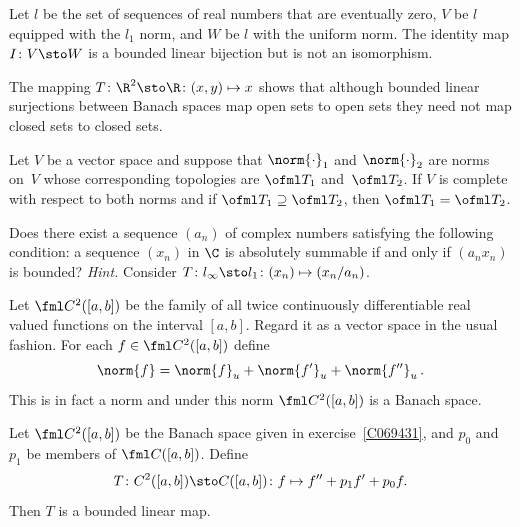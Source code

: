 \begin{exam} Let $l$ be the set of sequences of real numbers that are eventually zero,
$V$ be $l$ equipped with the $l_1$ norm, and $W$ be $l$ with the uniform norm.  The
identity map $I\colon V \sto W$ is a bounded linear bijection but is not an isomorphism.
\end{exam}

\begin{exam} The mapping $T\colon \R^2 \sto \R\colon (x,y) \mapsto x$ shows that although
bounded linear surjections between Banach spaces map open sets to open sets they need not
map closed sets to closed sets.
\end{exam}

\begin{prop} Let $V$ be a vector space and suppose that $\norm{\cdot}_1$ and
$\norm{\cdot}_2$ are norms on~$V$ whose corresponding topologies are $\ofml T_1$
and~$\ofml T_2$.  If $V$ is complete with respect to both norms and if $\ofml T_1
\supseteq \ofml T_2$, then $\ofml T_1 = \ofml T_2$.
\end{prop}

\begin{exer} Does there exist a sequence $(a_n)$ of complex numbers satisfying the
following condition: a sequence $(x_n)$ in $\C$ is absolutely summable if and only if
$(a_nx_n)$ is bounded? \emph{Hint.} Consider $ T\colon l_\infty \sto l_1\colon (x_n)
\mapsto (x_n/a_n)$.
\end{exer}

\begin{exam}\label{C069431} Let $\fml C^2([a,b])$ be the family of all twice continuously
differentiable real valued functions on the interval $[a,b]$. Regard it as a vector space
in the usual fashion. For each $f \in \fml C^2([a,b])$ define
    \[ \norm{f} = \norm{f}_u + \norm{f'}_u + \norm{f''}_u\,. \]
This is in fact a norm and under this norm $\fml C^2([a,b])$ is a Banach space.
\end{exam}

\begin{exam}\label{C069432} Let $\fml C^2([a,b])$ be the Banach space given in
exercise~\ref{C069431}, and $p_0$ and $p_1$ be members of $\fml C([a,b])$.   Define
  \[T\colon C^2([a,b]) \sto C([a,b])\colon
                      f \mapsto f'' + p_1f' + p_0f.\]
Then $T$ is a bounded linear map.
\end{exam}

